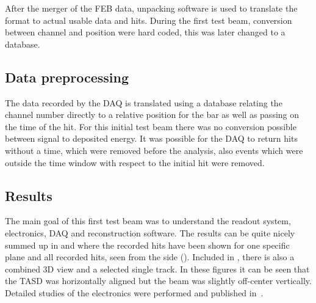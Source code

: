 After the merger of the FEB data, unpacking software is used to translate the format to actual usable data and hits. During the first test beam, conversion between channel and position were hard coded, this was later changed to a database.  


\subsection{Data preprocessing}

The data recorded by the DAQ is translated using a database relating the channel number directly to a relative position for the bar as well as passing on the time of the hit. For this initial test beam there was no conversion possible between signal to deposited energy. It was possible for the DAQ to return hits without a time, which were removed before the analysis, also events which were outside the time window with respect to the initial hit were removed.

\subsection{Results}

The main goal of this first test beam was to understand the readout system, electronics, DAQ and reconstruction software. The results can be quite nicely summed up in  and  where the recorded hits have been shown for one specific plane and all recorded hits, seen from the side (). Included in , there is also a combined 3D view and a selected single track. In these figures it can be seen that the TASD was horizontally aligned but the beam was slightly off-center vertically. Detailed studies of the electronics were performed and published in~\cite{52Georgi}.


